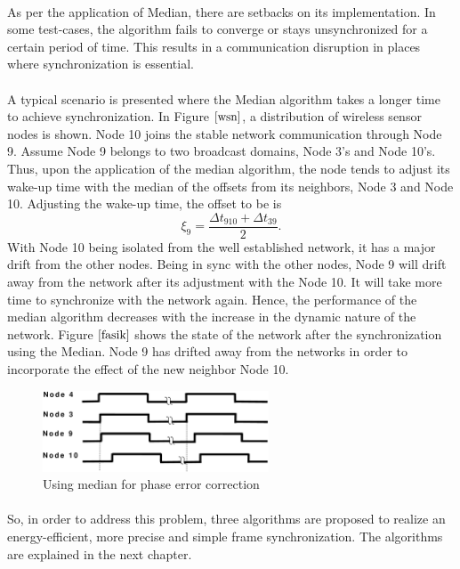 \documentclass[a4paper,10pt]{report}
\begin{document}
\paragraph*{} As per the application of Median, there are setbacks on its implementation. In some test-cases, the algorithm fails to converge or stays unsynchronized for a certain period of time. This results in a  communication disruption in places where synchronization is essential.
\paragraph*{} A typical scenario is presented where the Median algorithm takes a longer time to achieve synchronization. In Figure
$\ref{wsn}$, a distribution of wireless sensor nodes is shown. Node 10 joins the stable network communication through Node 9. Assume Node
9 belongs to two broadcast domains, Node 3's and Node 10's. Thus, upon the application of the median algorithm, the node tends to
adjust its wake-up time with the median of the offsets from its neighbors, Node 3 and Node 10. Adjusting the wake-up time, the offset to be is
\begin{equation}
\xi_9 = \frac{\Delta t_{910} + \Delta t_{39}}{2}.
\end{equation}
With Node 10 being isolated from the well established network, it has a major drift from the other nodes. Being in sync
with the other nodes, Node 9 will drift away from the network after its adjustment with the Node 10. It will take more time to
synchronize with the network again. Hence, the performance of the median algorithm decreases with the increase in the dynamic nature of the network. Figure $\ref{fasik}$ shows the state of the network after the synchronization using the Median. Node 9 has drifted away from the
networks in order to incorporate the effect of the new neighbor Node 10.
\begin{figure}
\centering
\includegraphics[width= 0.6\textwidth]{offsetpic}
\caption{Using median for phase error correction} \label{fasik}
\end{figure}
\paragraph*{}
So, in order to address this problem, three algorithms are proposed to realize an energy-efficient, more precise and simple frame synchronization. The algorithms are explained in the next chapter.
\end{document}
